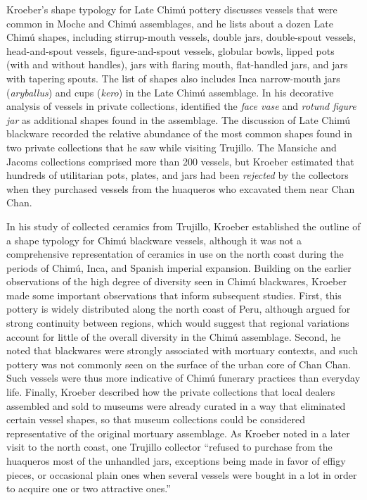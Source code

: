\documentclass[]{interact}
\theoremstyle{plain}%
\theoremstyle{definition}
\theoremstyle{remark}
\begin{document}
Kroeber's shape typology for Late Chimú pottery discusses vessels that
were common in Moche and Chimú assemblages, and he lists
\citep[22]{RN11151} about a dozen Late Chimú shapes, including
stirrup-mouth vessels, double jars, double-spout vessels, head-and-spout
vessels, figure-and-spout vessels, globular bowls, lipped pots (with and
without handles), jars with flaring mouth, flat-handled jars, and jars
with tapering spouts. The list of shapes also includes Inca narrow-mouth
jars (\emph{aryballus}) and cups (\emph{kero}) in the Late Chimú
assemblage. In his decorative analysis of vessels in private
collections, \citet[27-28]{RN11151} identified the \emph{face vase} and
\emph{rotund figure jar} as additional shapes found in the assemblage.
The discussion of Late Chimú blackware recorded the relative abundance
of the most common shapes found in two private collections that he saw
while visiting Trujillo. The Mansiche and Jacoms collections comprised
more than 200 vessels, but Kroeber estimated that hundreds of
utilitarian pots, plates, and jars had been \emph{rejected} by the
collectors when they purchased vessels from the huaqueros who excavated
them near Chan Chan.

In his study of collected ceramics from Trujillo, Kroeber established
the outline of a shape typology for Chimú blackware vessels, although it
was not a comprehensive representation of ceramics in use on the north
coast during the periods of Chimú, Inca, and Spanish imperial expansion.
Building on the earlier observations of the high degree of diversity
seen in Chimú blackwares, Kroeber made some important observations that
inform subsequent studies. First, this pottery is widely distributed
along the north coast of Peru, although \citet[97]{RN11155} argued for
strong continuity between regions, which would suggest that regional
variations account for little of the overall diversity in the Chimú
assemblage. Second, he noted that blackwares were strongly associated
with mortuary contexts, and such pottery was not commonly seen on the
surface of the urban core of Chan Chan. Such vessels were thus more
indicative of Chimú funerary practices than everyday life. Finally,
Kroeber described how the private collections that local dealers
assembled and sold to museums were already curated in a way that
eliminated certain vessel shapes, so that museum collections could be
considered representative of the original mortuary assemblage. As
Kroeber noted \citep[95]{RN11155} in a later visit to the north coast,
one Trujillo collector ``refused to purchase from the huaqueros most of
the unhandled jars, exceptions being made in favor of effigy pieces, or
occasional plain ones when several vessels were bought in a lot in order
to acquire one or two attractive ones.''
\end{document}
